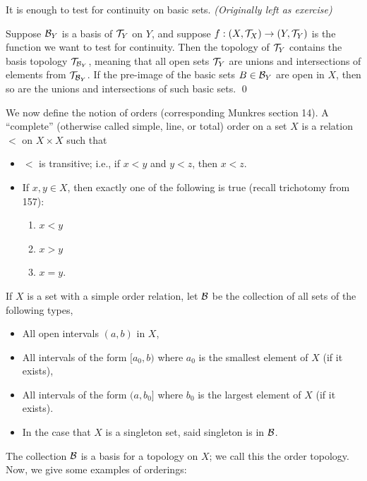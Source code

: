 \begin{simplethm}
    It is enough to test for continuity on basic sets. \textit{(Originally left as exercise)}
\end{simplethm}
\noindent Suppose $\mathcal B_Y$ is a basis of $\mathcal T_Y$ on $Y$, and suppose $f : (X, \mathcal T_X) \to (Y, \mathcal T_Y)$ is the function we want to test for continuity. Then the topology of $\mathcal T_Y$ contains the basis topology $\mathcal T_{\mathcal B_Y}$, meaning that all open sets $\mathcal T_Y$ are unions and intersections of elements from $\mathcal T_{\mathcal B_Y}$. If the pre-image of the basic sets $B \in \mathcal B_Y$ are open in $X$, then so are the unions and intersections of such basic sets. \qed

\newpage
\noindent We now define the notion of orders (corresponding Munkres section 14). A ``complete'' (otherwise called simple, line, or total) order on a set $X$ is a relation $<$ on $X \times X$ such that
\begin{itemize}
    \item $<$ is transitive; i.e., if $x < y$ and $y < z$, then $x < z$.
    \item If $x, y \in X$, then exactly one of the following is true (recall trichotomy from 157):
    \begin{enumerate}[label=(\alph*)]
        \item $x < y$
        \item $x > y$
        \item $x = y$.
    \end{enumerate}
\end{itemize}
\noindent If $X$ is a set with a simple order relation, let $\mathcal B$ be the collection of all sets of the following types,
\begin{itemize}
    \item All open intervals $(a, b)$ in $X$,
    \item All intervals of the form $[a_0, b)$ where $a_0$ is the smallest element of $X$ (if it exists),
    \item All intervals of the form $(a, b_0]$ where $b_0$ is the largest element of $X$ (if it exists).
    \item In the case that $X$ is a singleton set, said singleton is in $\mathcal B$.
\end{itemize}
The collection $\mathcal B$ is a basis for a topology on $X$; we call this the order topology. Now, we give some examples of orderings:
